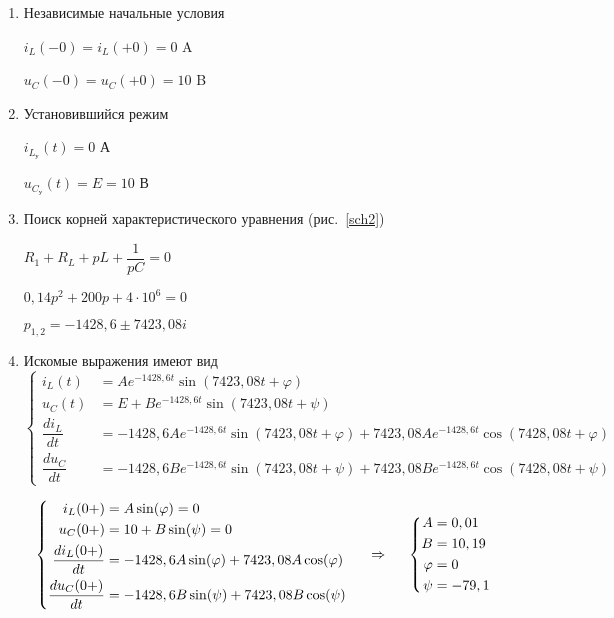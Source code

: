 \begin{enumerate}

\item{Независимые начальные условия}

$ i_L(-0) = i_L(+0) = 0 $ A

$ u_C(-0) = u_C(+0) = 10 $ B

\item{Установившийся режим}

$ i_{L_{\text{у}}}(t) = 0 $ А

$ u_{C_{\text{у}}}(t) = E = 10 $ В 

\item{Поиск корней характеристического уравнения (рис.~\ref{sch2})}

$ R_1 + R_L + pL + \dfrac{1}{pC} = 0 $

$ 0,14p^2 + 200p + 4 \cdot 10^6 = 0 $

$ p_{1,2} = -1428,6 \pm 7423,08i $

\item{Искомые выражения имеют вид}
$$
	\left\{
		\begin{aligned}
			i_L(t) &= Ae^{-1428,6t}\sin(7423,08t + \varphi) \\
            u_C(t) &= E + Be^{-1428,6t}\sin(7423,08t + \psi) \\
			\dfrac{di_L}{dt} &= -1428,6Ae^{-1428,6t}\sin(7423,08t + \varphi) + 7423,08Ae^{-1428,6t}\cos(7428,08t + \varphi) \\
			\dfrac{du_C}{dt} &= -1428,6Be^{-1428,6t}\sin(7423,08t + \psi) + 7423,08Be^{-1428,6t}\cos(7428,08t + \psi) 			
        \end{aligned}
	\right.
$$

$$
	\left\{
		\begin{aligned}
			i_L(0+) &= A\sin(\varphi) = 0 \\
            u_C(0+) &= 10 + B\sin(\psi) = 0 \\
			\dfrac{di_L(0+)}{dt} &= -1428,6A\sin(\varphi) + 7423,08A\cos(\varphi) \\
			\dfrac{du_C(0+)}{dt} &= -1428,6B\sin(\psi) + 7423,08B\cos(\psi) 			
        \end{aligned}
	\right.
\hspace{5mm}
\Rightarrow
\hspace{5mm}
    \left\{
	\begin{aligned}
	  A &= 0,01 \\
      B &= 10,19 \\
      \varphi &= 0 \\
      \psi &= -79,1^{}
    \end{aligned}
	\right.
$$


\end{enumerate}
